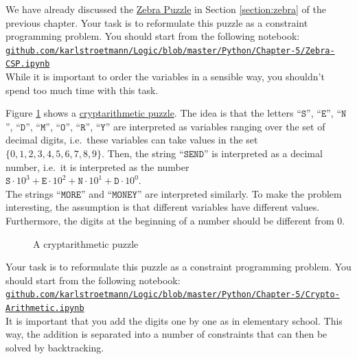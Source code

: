 \exerciseEng
We have already discussed the \href{https://en.wikipedia.org/wiki/Zebra_puzzle}{Zebra Puzzle} in Section
\ref{section:zebra} of the previous chapter.  Your task is to reformulate this puzzle as a constraint
programming problem.  You should start from the following notebook:
\\[0.2cm]
\hspace*{1.3cm}
\href{https://github.com/karlstroetmann/Logic/blob/master/Python/Chapter-5/Zebra-CSP.ipynb}{\texttt{github.com/karlstroetmann/Logic/blob/master/Python/Chapter-5/Zebra-CSP.ipynb}}
\\[0.2cm]
While it is important to order the variables in a sensible way, you shouldn't spend too much time with this
task.
\eox

\exerciseEng
Figure \ref{fig:send-more-money.pdf} shows a
\href{https://en.wikipedia.org/wiki/Verbal_arithmetic}{cryptarithmetic puzzle}.
The idea is that the letters 
``$\texttt{S}$'', ``$\texttt{E}$'', ``$\texttt{N}$'', ``$\texttt{D}$'', ``$\texttt{M}$'', ``$\texttt{O}$'', ``$\texttt{R}$'', ``$\texttt{Y}$'' 
are interpreted as variables ranging over the set of decimal digits, i.e.~these variables can take values in
the set $\{0,1,2,3,4,5,6,7,8,9\}$.  Then, the string ``$\texttt{SEND}$'' is interpreted as a decimal number,
i.e.~it is interpreted as the number
\\[0.2cm]
\hspace*{1.3cm}
$\texttt{S} \cdot 10^3 + \texttt{E} \cdot 10^2 + \texttt{N} \cdot 10^1 + \texttt{D} \cdot 10^0$.
\\[0.2cm]
The strings ``$\texttt{MORE}$'' and ``$\texttt{MONEY}$'' are interpreted similarly. To make the problem
interesting, the assumption is that different variables have different values.  Furthermore, the
digits at the beginning of a number should be different from $0$.


\begin{figure}[!ht]
\centering
{}

\caption{A cryptarithmetic puzzle}
\label{fig:send-more-money.pdf}
\end{figure}

Your task is to reformulate this puzzle as a constraint
programming problem.  You should start from the following notebook:
\\[0.2cm]
\href{https://github.com/karlstroetmann/Logic/blob/master/Python/Chapter-5/Crypto-Arithmetic.ipynb}{\small\texttt{github.com/karlstroetmann/Logic/blob/master/Python/Chapter-5/Crypto-Arithmetic.ipynb}}
\\[0.2cm]
It is important that you add the digits one by one as in elementary school.  This way, the addition is
separated into a number of constraints that can then be solved by backtracking.  \eox

